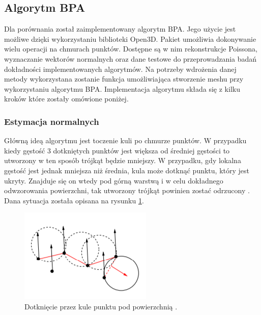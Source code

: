\subsection{Algorytm BPA}
Dla porównania został zaimplementowany algorytm BPA. Jego użycie jest możliwe dzięki wykorzystaniu biblioteki Open3D. Pakiet umożliwia dokonywanie wielu operacji na chmurach punktów. Dostępne są w nim rekonstrukcje Poissona, wyznaczanie wektorów normalnych oraz dane testowe do przeprowadzania badań dokładności implementowanych algorytmów. Na potrzeby wdrożenia danej metody wykorzystana zostanie funkcja umożliwiająca stworzenie meshu przy wykorzystaniu algorytmu BPA. Implementacja algorytmu składa się z kilku kroków które zostały omówione poniżej.
\subsubsection{Estymacja normalnych}
Główną ideą algorytmu jest toczenie kuli po chmurze punktów. W przypadku kiedy gęstość 3 dotkniętych punktów jest większa od średniej gęstości to utworzony w ten sposób trójkąt będzie mniejszy. W przypadku, gdy lokalna gęstość jest jednak mniejsza niż średnia, kula może dotknąć punktu, który jest ukryty. Znajduje się on wtedy pod górną warstwą i w celu dokładnego odwzorowania powierzchni, tak utworzony trójkąt powinien zostać odrzucony \cite{mittleman1999ball}. Dana sytuacja została opisana na rysunku \ref{fig:bpaWrongTria}.
\begin{figure}[H]
  \centering
  \includegraphics[scale=0.8]{bpa_wrong.PNG}
  \caption{Dotknięcie przez kule punktu pod powierzchnią \cite{mittleman1999ball}.}   
  \label{fig:bpaWrongTria}
\end{figure}

